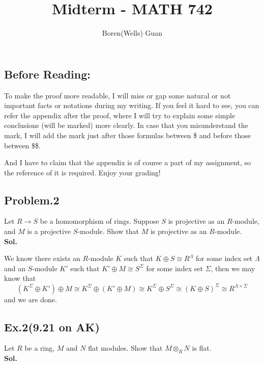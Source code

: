 \documentclass[lang=en,11pt,a4paper,citestyle =authoryear]{elegantpaper}
\title{Midterm - MATH 742}
\author{Boren(Wells) Guan}
\begin{document}
\maketitle

\subsection*{Before Reading:}\par
To make the proof more readable, I will miss or gap some natural or not important facts or notations during my writing. If you feel it hard to see, you can refer the appendix after the proof, where I will try to explain some simple conclusions (will be marked) more clearly. In case that you misunderstand the mark, I will add the mark just after those formulas between \$ and before those between \$\$.\par
And I have to claim that the appendix is of course a part of my assignment, so the reference of it is required. Enjoy your grading!

\subsection*{Problem.2} 
Let $R\to S$ be a homomorphism of rings. Suppose $S$ is projective as an $R$-module, and $M$ is a projective $S$-module. Show that $M$ is projective as an $R$-module.
\vspace{0.5em}\\
\textbf{Sol.} \par
    We know there exists an $R$-module $K$ such that $K\oplus S \cong R^{\Lambda}$ for some index set $\Lambda$ and an $S$-module $K'$ such that $K'\oplus M \cong S^{\Sigma}$ for some index set $\Sigma$, then we may know that \[(K^{\Sigma} \oplus K')\oplus M \cong K^{\Sigma} \oplus (K'\oplus M) \cong K^{\Sigma} \oplus S^{\Sigma} \cong (K\oplus S)^{\Sigma} \cong R^{\Lambda \times \Sigma}\] 
    and we are done.
\par 
\vspace{0.5em}

\subsection*{Ex.2(9.21 on AK)} 
Let $R$ be a ring, $M$ and $N$ flat modules. Show that $M\otimes_R N$ is flat.
\vspace{0.5em}\\
\textbf{Sol.} \par
\end{document}
